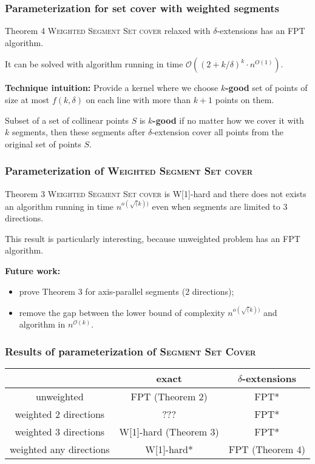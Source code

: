 \documentclass{beamer}
\begin{document}
\begin{frame}
\frametitle{Parameterization for set cover with weighted segments}
\begin{block}{Theorem 4}
	\textsc{Weighted Segment Set cover} relaxed
	with $\delta$-extensions has an FPT algorithm.
	
	It can be solved with algorithm running in time $\mathcal{O}((2+k/\delta)^k \cdot n^{O(1)})$.
\end{block}

\textbf{Technique intuition:} Provide a kernel where we choose
\textbf{$k$-good} set of points of size at most $f(k, \delta)$
on each line with more than $k+1$ points on them.

Subset of a set of collinear points $S$
is \textbf{$k$-good}
if no matter how we cover it with $k$
segments, then these segments after $\delta$-extension
cover all points from the original set of points $S$.
\end{frame}

\begin{frame}
\frametitle{Parameterization of \textsc{Weighted Segment Set cover}}

\begin{block}{Theorem 3}
	\textsc{Weighted Segment Set cover} is W[1]-hard
	and there does not exists an algorithm running in time $n^{o(\sqrt(k))}$
	even when segments are limited to 3 directions.
\end{block}


This result is particularly interesting, because unweighted problem 
has an FPT algorithm.

\bigskip

\textbf{Future work:}
\begin{itemize}
\item prove Theorem 3 for axis-parallel segments (2 directions);
\item remove the gap between the lower bound of complexity $n^{o(\sqrt(k))}$
and algorithm in $n^{\mathcal{O}(k)}$.
\end{itemize}

\end{frame}

\begin{frame}
\frametitle{Results of parameterization of \textsc{Segment Set Cover}}

\begin{tabular}{|c|c|c|}
\hline
           & exact & $\delta$-extensions \\
\hline
unweighted & \textcolor{olivegreen}{FPT (Theorem 2)} & \textcolor{olivegreen}{FPT*} \\
\hline
weighted 2 directions & ??? & \textcolor{olivegreen}{FPT*} \\
\hline
weighted 3 directions & \textcolor{olivegreen}{W[1]-hard (Theorem 3)} &  \textcolor{olivegreen}{FPT*}\\
\hline
weighted any directions & \textcolor{olivegreen}{W[1]-hard*} &  \textcolor{olivegreen}{FPT (Theorem 4)}\\
\hline
\end{tabular}

\end{frame}



\end{document}
